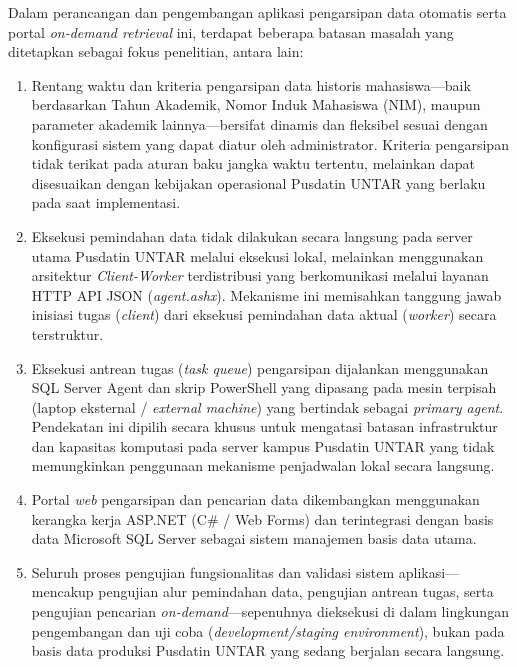 Dalam perancangan dan pengembangan aplikasi pengarsipan data otomatis serta portal \textit{on-demand retrieval} ini, terdapat beberapa batasan masalah yang ditetapkan sebagai fokus penelitian, antara lain:
\begin{enumerate}
    \item Rentang waktu dan kriteria pengarsipan data historis mahasiswa---baik berdasarkan Tahun Akademik, Nomor Induk Mahasiswa (NIM), maupun parameter akademik lainnya---bersifat dinamis dan fleksibel sesuai dengan konfigurasi sistem yang dapat diatur oleh administrator. Kriteria pengarsipan tidak terikat pada aturan baku jangka waktu tertentu, melainkan dapat disesuaikan dengan kebijakan operasional Pusdatin UNTAR yang berlaku pada saat implementasi.

    \item Eksekusi pemindahan data tidak dilakukan secara langsung pada server utama Pusdatin UNTAR melalui eksekusi lokal, melainkan menggunakan arsitektur \textit{Client-Worker} terdistribusi yang berkomunikasi melalui layanan HTTP API JSON (\textit{agent.ashx}). Mekanisme ini memisahkan tanggung jawab inisiasi tugas (\textit{client}) dari eksekusi pemindahan data aktual (\textit{worker}) secara terstruktur.

    \item Eksekusi antrean tugas (\textit{task queue}) pengarsipan dijalankan menggunakan SQL Server Agent dan skrip PowerShell yang dipasang pada mesin terpisah (laptop eksternal / \textit{external machine}) yang bertindak sebagai \textit{primary agent}. Pendekatan ini dipilih secara khusus untuk mengatasi batasan infrastruktur dan kapasitas komputasi pada server kampus Pusdatin UNTAR yang tidak memungkinkan penggunaan mekanisme penjadwalan lokal secara langsung.

    \item Portal \textit{web} pengarsipan dan pencarian data dikembangkan menggunakan kerangka kerja ASP.NET (C\# / Web Forms) dan terintegrasi dengan basis data Microsoft SQL Server sebagai sistem manajemen basis data utama.

    \item Seluruh proses pengujian fungsionalitas dan validasi sistem aplikasi---mencakup pengujian alur pemindahan data, pengujian antrean tugas, serta pengujian pencarian \textit{on-demand}---sepenuhnya dieksekusi di dalam lingkungan pengembangan dan uji coba (\textit{development/staging environment}), bukan pada basis data produksi Pusdatin UNTAR yang sedang berjalan secara langsung.
\end{enumerate}
